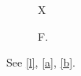 \documentclass{article}
\begin{document}
\begin{figure}X\caption{F.}\end{figure}
\begin{listing}
\caption{Both \protect{} and \protect{}.}\label{l}
\end{listing}
See \ref{l}, \ref{a}, \ref{b}.
\end{document}
